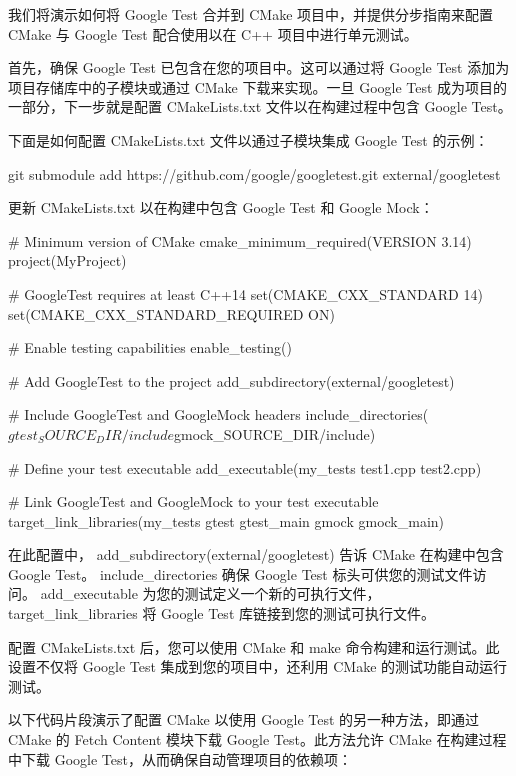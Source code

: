 我们将演示如何将 Google Test 合并到 CMake 项目中，并提供分步指南来配置 CMake 与 Google Test 配合使用以在 C++ 项目中进行单元测试。

首先，确保 Google Test 已包含在您的项目中。这可以通过将 Google Test 添加为项目存储库中的子模块或通过 CMake 下载来实现。一旦 Google Test 成为项目的一部分，下一步就是配置 CMakeLists.txt 文件以在构建过程中包含 Google Test。

下面是如何配置 CMakeLists.txt 文件以通过子模块集成 Google Test 的示例：

\begin{shell}
git submodule add https://github.com/google/googletest.git external/googletest
\end{shell}

更新 CMakeLists.txt 以在构建中包含 Google Test 和 Google Mock：

\begin{cmake}
# Minimum version of CMake
cmake_minimum_required(VERSION 3.14)
project(MyProject)

# GoogleTest requires at least C++14
set(CMAKE_CXX_STANDARD 14)
set(CMAKE_CXX_STANDARD_REQUIRED ON)

# Enable testing capabilities
enable_testing()

# Add GoogleTest to the project
add_subdirectory(external/googletest)

# Include GoogleTest and GoogleMock headers
include_directories(${gtest_SOURCE_DIR}/include ${gmock_SOURCE_DIR}/include)

# Define your test executable
add_executable(my_tests test1.cpp test2.cpp)

# Link GoogleTest and GoogleMock to your test executable
target_link_libraries(my_tests gtest gtest_main gmock gmock_main)
\end{cmake}

在此配置中， add\_subdirectory(external/googletest) 告诉 CMake 在构建中包含 Google Test。 include\_directories 确保 Google Test 标头可供您的测试文件访问。 add\_executable 为您的测试定义一个新的可执行文件， target\_link\_libraries 将 Google Test 库链接到您的测试可执行文件。

配置 CMakeLists.txt 后，您可以使用 CMake 和 make 命令构建和运行测试。此设置不仅将 Google Test 集成到您的项目中，还利用 CMake 的测试功能自动运行测试。

以下代码片段演示了配置 CMake 以使用 Google Test 的另一种方法，即通过 CMake 的 Fetch Content 模块下载 Google Test。此方法允许 CMake 在构建过程中下载 Google Test，从而确保自动管理项目的依赖项：

